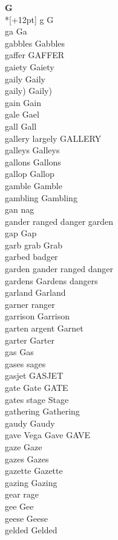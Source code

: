 \vspace{14pt}
\noindent\textbf{\Large G}\\*[+12pt]
g G\\
ga Ga\\
gabbles Gabbles\\
gaffer GAFFER\\
gaiety Gaiety\\
gaily Gaily\\
gaily) Gaily)\\
gain Gain\\
gale Gael\\
gall Gall\\
gallery largely GALLERY\\
galleys Galleys\\
gallons Gallons\\
gallop Gallop\\
gamble Gamble\\
gambling Gambling\\
gan nag\\
gander ranged danger garden\\
gap Gap\\
garb grab Grab\\
garbed badger\\
garden gander ranged danger\\
gardens Gardens dangers\\
garland Garland\\
garner ranger\\
garrison Garrison\\
garten argent Garnet\\
garter Garter\\
gas Gas\\
gases sages\\
gasjet GASJET\\
gate Gate GATE\\
gates stage Stage\\
gathering Gathering\\
gaudy Gaudy\\
gave Vega Gave GAVE\\
gaze Gaze\\
gazes Gazes\\
gazette Gazette\\
gazing Gazing\\
gear rage\\
gee Gee\\
geese Geese\\
gelded Gelded\\
